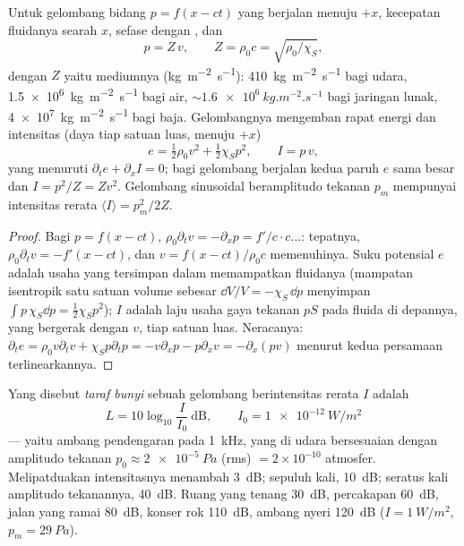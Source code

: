 \begin{proposition}\label{prop:b2:sound-waves:plane}
Untuk gelombang bidang $p = f(x - ct)$ yang berjalan menuju $+x$, kecepatan
fluidanya searah $x$, sefase dengan , dan
\[
p = Z\,v , \qquad Z = \rho_0c = \sqrt{\rho_0/\chi_S} ,
\]
dengan $Z$ yaitu \emph{} mediumnya
(\unit{kg.m^{-2}.s^{-1}}): \qty{410}{kg.m^{-2}.s^{-1}} bagi udara, \qty{1.5e6}{kg.m^{-2}.s^{-1}}
bagi air, $\sim\qty{1.6e6}{kg.m^{-2}.s^{-1}}$ bagi jaringan lunak,
\qty{4e7}{kg.m^{-2}.s^{-1}} bagi baja. Gelombangnya mengemban rapat energi dan
intensitas (daya tiap satuan luas, menuju $+x$)
\[
e = \tfrac12\rho_0v^2 + \tfrac12\chi_Sp^2 , \qquad I = p\,v ,
\]
yang menuruti $\partial_te + \partial_xI = 0$; bagi gelombang berjalan kedua
paruh $e$ sama besar dan $I = p^2/Z = Zv^2$. Gelombang sinusoidal
beramplitudo tekanan $p_m$ mempunyai intensitas rerata $\langle I\rangle = p_m^2/2Z$.
\end{proposition}

\begin{proof}
Bagi $p = f(x - ct)$, $\rho_0\partial_tv = -\partial_xp = f'/c\cdot c\dots$: tepatnya,
$\rho_0\partial_tv = -f'(x - ct)$, dan $v = f(x - ct)/\rho_0c$ memenuhinya. Suku
potensial $e$ adalah usaha yang tersimpan dalam memampatkan fluidanya
(mampatan isentropik satu satuan volume sebesar $\dd V/V = -\chi_S\,\dd p$
menyimpan $\int p\,\chi_S\dd p = \tfrac12\chi_Sp^2$); $I$ adalah laju usaha
gaya tekanan $pS$ pada fluida di depannya, yang bergerak dengan $v$, tiap satuan luas.
Neracanya: $\partial_te = \rho_0v\partial_tv + \chi_Sp\partial_tp = -v\partial_xp - p\partial_xv =
-\partial_x(pv)$ menurut kedua persamaan terlinearkannya.
\end{proof}

\begin{definition}\label{def:b2:sound-waves:decibel}
Yang disebut \emph{taraf bunyi} sebuah gelombang berintensitas rerata $I$ adalah
\[
L = 10\log_{10}\frac I{I_0} \ \text{dB} , \qquad I_0 = \qty{1e-12}{W/m^2}
\]
--- yaitu ambang pendengaran pada \qty{1}{kHz}, yang di udara bersesuaian dengan
amplitudo tekanan $p_0 \approx \qty{2e-5}{Pa}$ (rms) $= 2 \times 10^{-10}$
atmosfer. Melipatduakan intensitasnya menambah \qty{3}{dB}; sepuluh kali, \qty{10}{dB};
seratus kali amplitudo tekanannya, \qty{40}{dB}. Ruang yang tenang
\qty{30}{dB}, percakapan \qty{60}{dB}, jalan yang ramai \qty{80}{dB}, konser rok
\qty{110}{dB}, ambang nyeri \qty{120}{dB} ($I = \qty{1}{W/m^2}$, $p_m = \qty{29}{Pa}$).
\end{definition}

